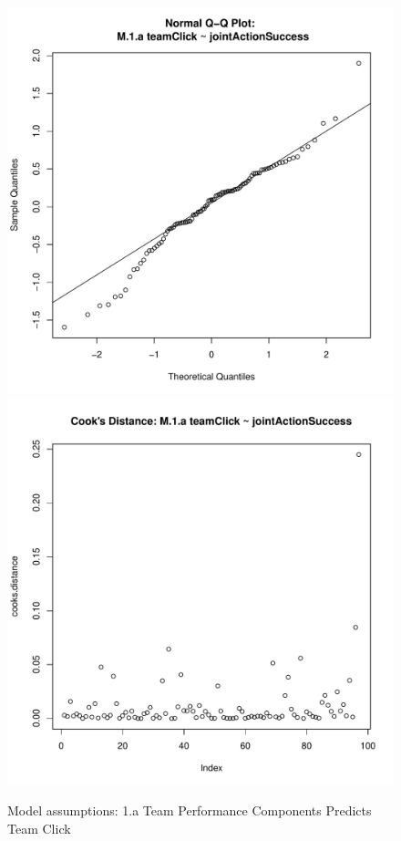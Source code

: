 {\begin{figure}[htbp]
     \includegraphics[scale =.4]{images/MLM1aQQPlot.pdf}
     \includegraphics[scale =.4]{images/MLM1aCooksD.pdf}
     \caption{Model assumptions: 1.a Team Performance Components Predicts Team Click}
     \label{fig:MLM1aAssumptions}
 \end{figure}



}
